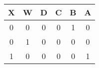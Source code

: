 \begin{tabular}{|c|c||c|c|c|c|}
\hline
X & W & D & C & B & A\\
\hline
0 & 0 & 0 & 0 & 1 & 0\\
0 & 1 & 0 & 0 & 0 & 0\\
1 & 0 & 0 & 0 & 0 & 1\\
\hline
\end{tabular}
